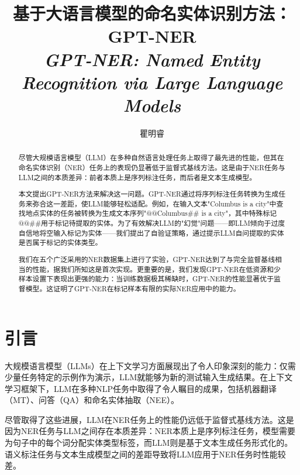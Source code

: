 \documentclass[supercite]{Experimental_Report}
\title{%
  \texorpdfstring{%
    基于大语言模型的命名实体识别方法：GPT-NER\\
    \textit{GPT-NER: Named Entity Recognition via Large Language Models}%
  }{基于大语言模型的命名实体识别方法：GPT-NER}%
}
\author{瞿明睿}
\theoremstyle{definition}
\begin{document}
\maketitle
\clearpage



\begin{abstract}
尽管大规模语言模型（LLM）在多种自然语言处理任务上取得了最先进的性能，但其在命名实体识别（NER）任务上的表现仍显著低于监督式基线方法。这是由于NER任务与LLM之间的本质差异：前者本质上是序列标注任务，而后者是文本生成模型。

本文提出GPT-NER方法来解决这一问题。GPT-NER通过将序列标注任务转换为生成任务来弥合这一差距，使LLM能够轻松适配。例如，在输入文本"Columbus is a city"中查找地点实体的任务被转换为生成文本序列"@@Columbus\#\# is a city"，其中特殊标记@@\#\#用于标记待提取的实体。为了有效解决LLM的"幻觉"问题——即LLM倾向于过度自信地将空输入标记为实体——我们提出了自验证策略，通过提示LLM自问提取的实体是否属于标记的实体类型。

我们在五个广泛采用的NER数据集上进行了实验，GPT-NER达到了与完全监督基线相当的性能，据我们所知这是首次实现。更重要的是，我们发现GPT-NER在低资源和少样本设置下表现出更强的能力：当训练数据极其稀缺时，GPT-NER的性能显著优于监督模型。这证明了GPT-NER在标记样本有限的实际NER应用中的能力。
\end{abstract}

\section{引言}

大规模语言模型（LLMs）\cite{brown2020language,smith2022using,du2022glam,rae2021scaling,thoppilan2022lamda,hoffmann2022training,chowdhery2022palm,touvron2023llama}在上下文学习方面展现出了令人印象深刻的能力：仅需少量任务特定的示例作为演示，LLM就能够为新的测试输入生成结果。在上下文学习框架下，LLM在多种NLP任务中取得了令人瞩目的成果，包括机器翻译（MT）\cite{vilar2022prompting,vidal2022automatic,moslem2023adaptive}、问答（QA）\cite{robinson2022leveraging,li2022self,lazaridou2022internet}和命名实体抽取（NEE）\cite{chowdhery2022palm,brown2020language}。

尽管取得了这些进展，LLM在NER任务上的性能仍远低于监督式基线方法。这是因为NER任务与LLM之间存在本质差异：NER本质上是序列标注任务，模型需要为句子中的每个词分配实体类型标签，而LLM则是基于文本生成任务形式化的。语义标注任务与文本生成模型之间的差距导致将LLM应用于NER任务时性能较差。
\end{document}
